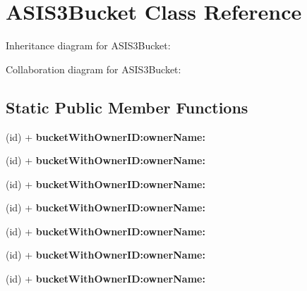 \hypertarget{interface_a_s_i_s3_bucket}{
\section{\-A\-S\-I\-S3\-Bucket \-Class \-Reference}
\label{interface_a_s_i_s3_bucket}
}


\-Inheritance diagram for \-A\-S\-I\-S3\-Bucket\-:


\-Collaboration diagram for \-A\-S\-I\-S3\-Bucket\-:
\subsection*{\-Static \-Public \-Member \-Functions}
\begin{DoxyCompactItemize}
\item 
\hypertarget{interface_a_s_i_s3_bucket_a8290afccd00ee3a62be379100f363ef9}{
(id) + {\bfseries bucket\-With\-Owner\-I\-D\-:owner\-Name\-:}}
\label{interface_a_s_i_s3_bucket_a8290afccd00ee3a62be379100f363ef9}

\item 
\hypertarget{interface_a_s_i_s3_bucket_a8290afccd00ee3a62be379100f363ef9}{
(id) + {\bfseries bucket\-With\-Owner\-I\-D\-:owner\-Name\-:}}
\label{interface_a_s_i_s3_bucket_a8290afccd00ee3a62be379100f363ef9}

\item 
\hypertarget{interface_a_s_i_s3_bucket_a8290afccd00ee3a62be379100f363ef9}{
(id) + {\bfseries bucket\-With\-Owner\-I\-D\-:owner\-Name\-:}}
\label{interface_a_s_i_s3_bucket_a8290afccd00ee3a62be379100f363ef9}

\item 
\hypertarget{interface_a_s_i_s3_bucket_a8290afccd00ee3a62be379100f363ef9}{
(id) + {\bfseries bucket\-With\-Owner\-I\-D\-:owner\-Name\-:}}
\label{interface_a_s_i_s3_bucket_a8290afccd00ee3a62be379100f363ef9}

\item 
\hypertarget{interface_a_s_i_s3_bucket_a8290afccd00ee3a62be379100f363ef9}{
(id) + {\bfseries bucket\-With\-Owner\-I\-D\-:owner\-Name\-:}}
\label{interface_a_s_i_s3_bucket_a8290afccd00ee3a62be379100f363ef9}

\item 
\hypertarget{interface_a_s_i_s3_bucket_a8290afccd00ee3a62be379100f363ef9}{
(id) + {\bfseries bucket\-With\-Owner\-I\-D\-:owner\-Name\-:}}
\label{interface_a_s_i_s3_bucket_a8290afccd00ee3a62be379100f363ef9}

\item 
\hypertarget{interface_a_s_i_s3_bucket_a8290afccd00ee3a62be379100f363ef9}{
(id) + {\bfseries bucket\-With\-Owner\-I\-D\-:owner\-Name\-:}}
\label{interface_a_s_i_s3_bucket_a8290afccd00ee3a62be379100f363ef9}


\end{DoxyCompactItemize}
